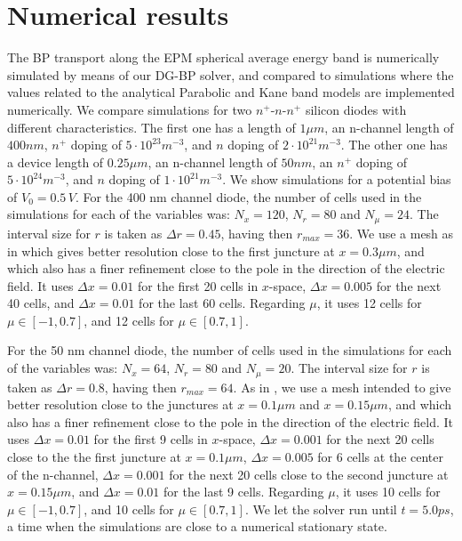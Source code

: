 \documentclass[11pt]{article}
\begin{document}
\section{Numerical results}
%
The BP transport along the EPM spherical average energy band is
numerically simulated by means of our DG-BP solver, and compared to simulations where 
the values related to the analytical Parabolic and Kane band models are implemented numerically. 
We compare simulations for two $n^+$-$n$-$n^+$ silicon diodes with different characteristics.
The first one has a length of  $1 \mu m$, an n-channel length of $400 nm$, 
$n^+$ doping of ${5 \cdot 10^{23} }m^{-3}$, and $n$ doping of ${2 \cdot 10^{21} }m^{-3}$.
The other one has a device length of $0.25 \mu m$, an n-channel length of $50nm$,
an $n^+$ doping of ${5 \cdot 10^{24} }m^{-3}$, 
and $n$ doping of ${1 \cdot 10^{21} }m^{-3}$. 
We show simulations for a potential bias of  $ V_{0}=0.5 \, V$.
For the 400 nm channel diode, the number of cells used in the simulations for each of the variables was:
$N_x=120$, $N_r= 80$ and $N_{\mu}=24$. The interval size for $r$ is taken as $\Delta r = 0.45$, having
then $r_{max} = 36$. 
We use a mesh as in \cite{CGMS-CMAME2008} which gives better resolution close to the first juncture at $x = 0.3 \mu m$,
and which also has a finer refinement close to the pole in the direction of the electric field.
It uses $\Delta x = 0.01$ for the first 20 cells in $x$-space, 
$\Delta x = 0.005$ for the next 40 cells, and $\Delta x = 0.01$ for the last 60 cells. Regarding $\mu$,  
it uses 12 cells for $\mu \in [-1,0.7]$, and 12 cells for $\mu \in [0.7, 1]$. 

For the 50 nm channel diode, the number of cells used in the simulations for each of the variables was:
$N_x=64$, $N_r= 80$ and $N_{\mu}=20$. The interval size for $r$ is taken as $\Delta r = 0.8$, having
then $r_{max} = 64$. 
As in \cite{CGMS-CMAME2008}, we use a mesh intended to give better resolution close to the junctures at $x = 0.1 \mu m$ and $x=0.15 \mu m$,
and which also has a finer refinement close to the pole in the direction of the electric field.
It uses $\Delta x = 0.01$ for the first 9 cells in $x$-space, 
$\Delta x = 0.001$ for the next 20 cells close to the the first juncture at $x=0.1\mu m$, 
$\Delta x = 0.005$ for 6 cells at the center of the n-channel, 
$\Delta x = 0.001$ for the next 20 cells close to the second juncture at $x=0.15\mu m$, and $\Delta x = 0.01$ for the last 9 cells. Regarding $\mu$,  it uses 10 cells for $\mu \in [-1,0.7]$, and 10 cells for $\mu \in [0.7, 1]$. 
We let the solver run until $t = 5.0 ps$, a time when the simulations are close to a numerical stationary state. \\
\end{document}
